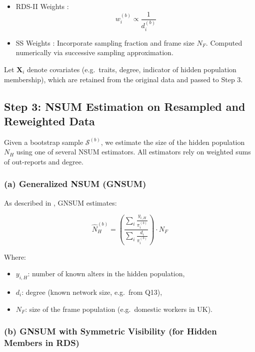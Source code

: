 \documentclass[
  12pt,
  letterpaper,
  DIV=11,
  numbers=noendperiod]{scrartcl}
\theoremstyle{plain}
\theoremstyle{definition}
\begin{document}
\begin{itemize}
\item
  RDS-II Weights \autocite{volz08-probability}: \[
  w_i^{(b)} \propto \frac{1}{d_i^{(b)}}
  \]
\item
  SS Weights \autocite{gile11-improved}: Incorporate sampling fraction
  and frame size \(N_F\). Computed numerically via successive sampling
  approximation.
\end{itemize}

Let \(\mathbf{X}_i\) denote covariates (e.g.~traits, degree, indicator
of hidden population membership), which are retained from the original
data and passed to Step 3.

\subsection{Step 3: NSUM Estimation on Resampled and Reweighted
Data}\label{step-3-nsum-estimation-on-resampled-and-reweighted-data}

Given a bootstrap sample \(\mathcal{S}^{(b)}\), we estimate the size of
the hidden population \(N_H\) using one of several NSUM estimators. All
estimators rely on weighted sums of out-reports and degree.

\subsubsection{(a) Generalized NSUM
(GNSUM)}\label{a-generalized-nsum-gnsum}

As described in \textcite{feeh16-generalizing}, GNSUM estimates:

\[\hat{N}_H^{(b)} = \left( \frac{\sum_{i} \frac{y_{i,H}}{\pi_i^{(b)}}}{\sum_{i} \frac{d_i}{\pi_i^{(b)}}} \right) \cdot N_F\]

Where:

\begin{itemize}
\item
  \(y_{i,H}\): number of known alters in the hidden population,
\item
  \(d_i\): degree (known network size, e.g.~from Q13),
\item
  \(N_F\): size of the frame population (e.g.~domestic workers in UK).
\end{itemize}

\subsubsection{(b) GNSUM with Symmetric Visibility (for Hidden Members
in
RDS)}\label{b-gnsum-with-symmetric-visibility-for-hidden-members-in-rds}
\end{document}
